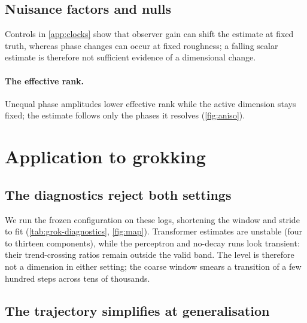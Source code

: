 \documentclass{article}
\newenvironment{claude}{\color{claudecolor}}{}
\begin{document}
\begin{claude}
\subsection{Nuisance factors and nulls}\label{sec:nuisance}

Controls in \cref{app:clocks} show that observer gain can shift the estimate at fixed truth,
whereas phase changes can occur at fixed roughness; a falling scalar estimate is therefore not
sufficient evidence of a dimensional change.
\end{claude}

\begin{claude}
\paragraph{The effective rank.}\label{sec:aniso} Unequal phase amplitudes lower effective rank
while the active dimension stays fixed; the estimate follows only the phases it resolves
(\cref{fig:aniso}).
\end{claude}

\section{Application to grokking}\label{sec:grokking}

\subsection{The diagnostics reject both settings}\label{sec:grok-diagnostics}

\begin{claude}
We run the frozen configuration on these logs, shortening the window and stride to fit
(\cref{tab:grok-diagnostics}, \cref{fig:map}). Transformer estimates are unstable (four to
thirteen components), while the perceptron and no-decay runs look transient: their trend-crossing
ratios remain outside the valid band. The level is therefore not a dimension in either setting;
the coarse window smears a transition of a few hundred steps across tens of thousands.
\end{claude}

\subsection{The trajectory simplifies at generalisation}\label{sec:direct}
\end{document}
